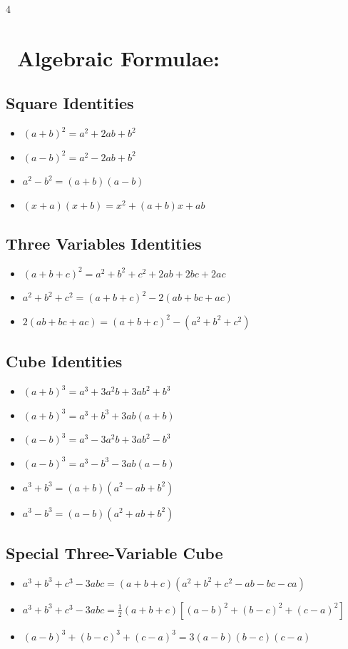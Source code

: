 \begin{multicols*}{4}
\section*{\ Algebraic Formulae:}

\subsection*{ Square Identities}
\begin{itemize}
    \item $(a + b)^2 = a^2 + 2ab + b^2$
    \item $(a - b)^2 = a^2 - 2ab + b^2$
    \item $a^2 - b^2 = (a + b)(a - b)$
    \item $(x + a)(x + b) = x^2 + (a + b)x + ab$
\end{itemize}

\subsection*{ Three Variables Identities}
\begin{itemize}
    \item  $(a + b + c)^2 = a^2 + b^2 + c^2 + 2ab + 2bc + 2ac$
    \item  $a^2 + b^2 + c^2 = (a + b + c)^2 - 2(ab + bc + ac)$
    \item  $2(ab + bc + ac) = (a + b + c)^2 - (a^2 + b^2 + c^2)$
\end{itemize}

\subsection*{ Cube Identities}
\begin{itemize}
    \item  $(a + b)^3 = a^3 + 3a^2b + 3ab^2 + b^3$
    \item  $(a + b)^3 = a^3 + b^3 + 3ab(a + b)$
    \item  $(a - b)^3 = a^3 - 3a^2b + 3ab^2 - b^3$
    \item  $(a - b)^3 = a^3 - b^3 - 3ab(a - b)$
    \item  $a^3 + b^3 = (a + b)(a^2 - ab + b^2)$
    \item  $a^3 - b^3 = (a - b)(a^2 + ab + b^2)$
\end{itemize}

\subsection*{ Special Three-Variable Cube}
\begin{itemize}
    \item  $a^3 + b^3 + c^3 - 3abc = (a + b + c)(a^2 + b^2 + c^2 - ab - bc - ca)$
    \item  $a^3 + b^3 + c^3 - 3abc = \frac{1}{2}(a + b + c)[(a - b)^2 + (b - c)^2 + (c - a)^2]$
    \item  $(a - b)^3 + (b - c)^3 + (c - a)^3 = 3(a - b)(b - c)(c - a)$
\end{itemize}


\end{multicols*}

